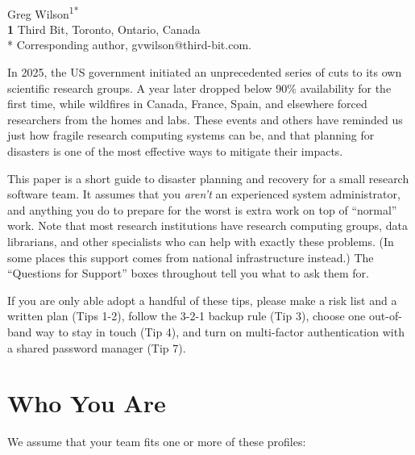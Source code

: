 \documentclass[10pt,letterpaper]{article}
\begin{document}
\vspace*{0.2in}

\begin{flushleft}
  {\Large
    \textbf{}
  }
  \newline
  \\
  {Greg Wilson}\textsuperscript{1*}
  \\
  \bigskip
  \textbf{1} Third Bit, Toronto, Ontario, Canada\\
  * Corresponding author, gvwilson@third-bit.com.
\end{flushleft}

In 2025, the US government initiated an unprecedented series of cuts to its own
scientific research groups.  A year later 
dropped below 90\% availability for the first time, while wildfires in Canada,
France, Spain, and elsewhere forced researchers from the homes and labs.  These
events and others have reminded us just how fragile research computing systems
can be, and that planning for disasters is one of the most effective ways to
mitigate their impacts.

This paper is a short guide to disaster planning and recovery for a small
research software team.  It assumes that you \emph{aren't} an experienced system
administrator, and anything you do to prepare for the worst is extra work on top
of ``normal'' work.  Note that most research institutions have research
computing groups, data librarians, and other specialists who can help with
exactly these problems. (In some places this support comes from national
infrastructure instead.)  The ``Questions for Support'' boxes throughout tell
you what to ask them for.

\begin{notebox}[Priorities]
  If you are only able adopt a handful of these tips, please make a risk list
  and a written plan (Tips 1-2), follow the 3-2-1 backup rule (Tip 3), choose
  one out-of-band way to stay in touch (Tip 4), and turn on multi-factor
  authentication with a shared password manager (Tip 7).
\end{notebox}

\section*{Who You Are}

We assume that your team fits one or more of these profiles:
\end{document}
